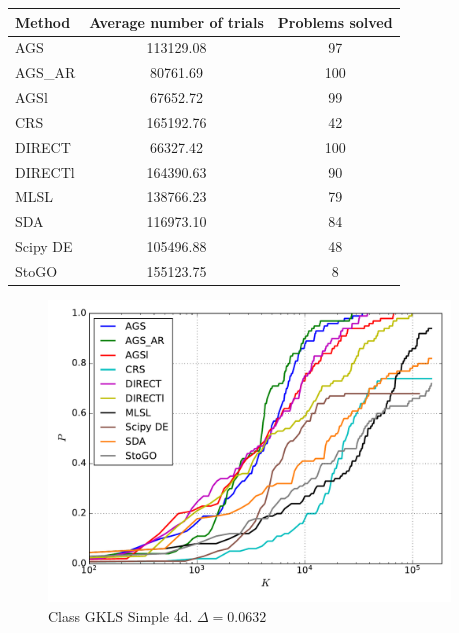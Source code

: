 \documentclass[a4paper]{article}
\begin{document}
\begin{tabular}{lcc}
\hline
 Method   &  Average number of trials  &  Problems solved  \\
\hline
 AGS      &         113129.08          &        97         \\
 AGS\_AR   &          80761.69          &        100        \\
 AGSl     &          67652.72          &        99         \\
 CRS      &         165192.76          &        42         \\
 DIRECT   &          66327.42          &        100        \\
 DIRECTl  &         164390.63          &        90         \\
 MLSL     &         138766.23          &        79         \\
 SDA      &         116973.10          &        84         \\
 Scipy DE &         105496.88          &        48         \\
 StoGO    &         155123.75          &         8         \\
\hline
\end{tabular}
\begin{figure}[H]
  \center
  \includegraphics[width=0.95\textwidth]{../experiments/gklss4d_serg/cmc.pdf}
  \caption{Class GKLS Simple 4d. $\Delta=0.0632$}
\end{figure}
\end{document}

